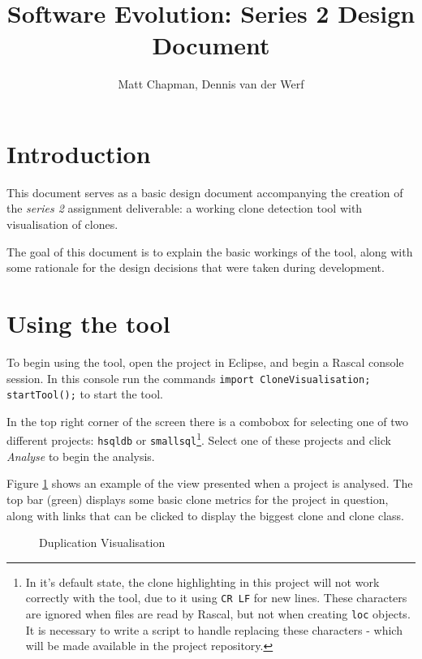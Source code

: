 \documentclass{article}
\title{Software Evolution: Series 2 Design Document}
\author{Matt Chapman, Dennis van der Werf}
\begin{document}
\maketitle
\section{Introduction}

This document serves as a basic design document accompanying the creation of the \textit{series 2} assignment deliverable: a working clone detection tool with visualisation of clones.

The goal of this document is to explain the basic workings of the tool, along with some rationale for the design decisions that were taken during development.

\section{Using the tool}
To begin using the tool, open the project in Eclipse, and begin a Rascal console session. In this console run the commands \texttt{import CloneVisualisation; startTool();} to start the tool.

In the top right corner of the screen there is a combobox for selecting one of two different projects: \texttt{hsqldb} or \texttt{smallsql}\footnote{In it's default state, the clone highlighting in this project will not work correctly with the tool, due to it using \texttt{CR LF} for new lines. These characters are ignored when files are read by Rascal, but not when creating \texttt{loc} objects. It is necessary to write a script to handle replacing these characters - which will be made available in the project repository.}. Select one of these projects and click \textit{Analyse} to begin the analysis.

Figure \ref{fig:shot1} shows an example of the view presented when a project is analysed. The top bar (green) displays some basic clone metrics for the project in question, along with links that can be clicked to display the biggest clone and clone class.\newpage

\begin{figure}[h]
\centering
{}
\caption{Duplication Visualisation}
\label{fig:shot1}
\end{figure}
\end{document}
